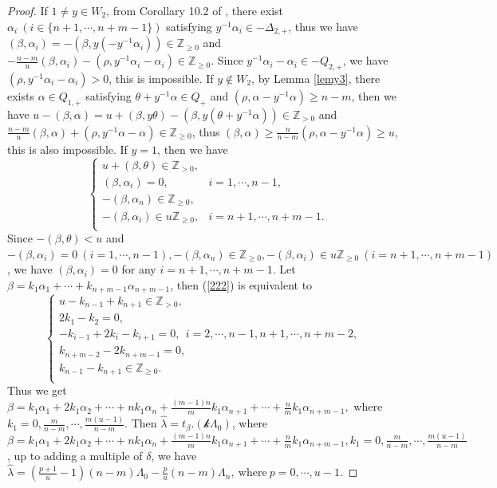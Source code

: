 \documentclass[12pt]{article}
\begin{document}
\begin{proof}
If $1\ne y\in W_2$, from Corollary 10.2 of \cite{Hum78}, there exist $\alpha_i ~(i\in\{n+1,\cdots,n+m-1\})$ satisfying $y^{-1}\alpha_i\in -\Delta_{2,+}$,
thus we have $(\beta,\alpha_i)=-(\beta,y(-y^{-1}\alpha_i))\in\mathbb{Z}_{\geq0}$ and $-\frac{n-m}{u}(\beta,\alpha_i)-(\rho,y^{-1}\alpha_i-\alpha_i)\in \mathbb{Z}_{\geq0}$.
Since $y^{-1}\alpha_i-\alpha_i\in-Q_{2,+}$, we have $(\rho,y^{-1}\alpha_i-\alpha_i)>0$,
this is impossible.
If $y\notin W_2$, by Lemma \ref{lemy3}, there exists $\alpha\in Q_{1,+}$ satisfying $\theta+y^{-1}\alpha\in Q_+$ and $(\rho,\alpha-y^{-1}\alpha)\geq n-m$,
then we have $u-(\beta,\alpha)=u+(\beta,y\theta)-(\beta,y(\theta+y^{-1}\alpha))\in\mathbb{Z}_{>0}$ and $\frac{n-m}{u}(\beta,\alpha)+(\rho,y^{-1}\alpha-\alpha)\in \mathbb{Z}_{\geq0}$, thus $(\beta,\alpha)\geq\frac{u}{n-m}(\rho,\alpha-y^{-1}\alpha)\geq u$,
this is also impossible.
If $y=1$, then we have
\begin{equation}\label{222}
\begin{cases}
  u+(\beta,\theta)\in\mathbb{Z}_{>0},\\
  (\beta,\alpha_i)=0, &i=1,\cdots,n-1,\\
  -(\beta,\alpha_n)\in\mathbb{Z}_{\geq0},\\
  -(\beta,\alpha_i)\in u\mathbb{Z}_{\geq0},&i=n+1,\cdots,n+m-1.\\
\end{cases}
\end{equation}
Since $-(\beta,\theta)<u$ and $-(\beta,\alpha_i)=0~(i=1,\cdots,n-1),
  -(\beta,\alpha_n)\in\mathbb{Z}_{\geq0},
  -(\beta,\alpha_i)\in u\mathbb{Z}_{\geq0}~(i=n+1,\cdots,n+m-1)$,
we have $(\beta,\alpha_i)=0$ for any $i=n+1,\cdots,n+m-1$.
Let $\beta=k_1\alpha_1+\cdots+k_{n+m-1}\alpha_{n+m-1}$,
then (\ref{222}) is equivalent to
$$\begin{cases}
  u-k_{n-1}+k_{n+1}\in\mathbb{Z}_{>0},&\\
  2k_1-k_2=0,&\\
  -k_{i-1}+2k_i-k_{i+1}=0,~~i=2,\cdots,n-1,n+1,\cdots,n+m-2,\\
   k_{n+m-2}-2k_{n+m-1}=0,\\
  k_{n-1}-k_{n+1}\in\mathbb{Z}_{\geq0}.\\
\end{cases}$$
Thus we get $\beta=k_1\alpha_1+2k_1\alpha_2+\cdots+nk_1\alpha_n+\frac{(m-1)n}{m}k_1\alpha_{n+1}+\cdots+\frac{n}{m}k_1\alpha_{n+m-1},$ where $k_1=0,\frac{m}{n-m},\cdots,\frac{m(u-1)}{n-m}$.
Then $\hat{\lambda}=t_\beta.(\mathcal{k}\Lambda_0)$, where $\beta=k_1\alpha_1+2k_1\alpha_2+\cdots+nk_1\alpha_n+\frac{(m-1)n}{m}k_1\alpha_{n+1}+\cdots+\frac{n}{m}k_1\alpha_{n+m-1}, k_1=0,\frac{m}{n-m},\cdots,\frac{m(u-1)}{n-m}$,
up to adding a multiple of $\delta$,
we have $\hat{\lambda}=(\frac{p+1}{u}-1)(n-m)\Lambda_0-\frac{p}{u}(n-m)\Lambda_n,~\mbox{where}~p=0,\cdots,u-1.$
\end{proof}
\end{document}
